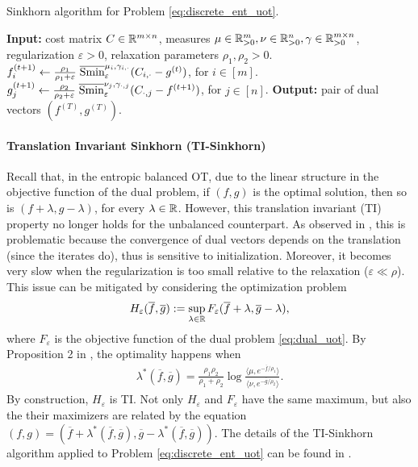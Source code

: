\begin{algorithm}[t]
  \caption{Sinkhorn algorithm for Problem \eqref{eq:discrete_ent_uot}.}
  \label{alg:Sinkhorn_algo}
\begin{algorithmic}[1]
  \STATE \textbf{Input:} cost matrix $C \in \mathbb R^{m \times n}$,
  measures $\mu \in \mathbb R^m_{> 0}, \nu \in \mathbb R^n_{> 0}, \gamma \in \mathbb R^{m \times n}_{> 0}$,
  regularization $\varepsilon > 0$, relaxation parameters $\rho_1, \rho_2 > 0$.
  \STATE $f_i^{(t+1)} \gets \frac{\rho_1}{\rho_1 + \varepsilon} \;
  \overline{\text{Smin}}^{\mu_i, \gamma_{i, \cdot}}_{\varepsilon}(C_{i, \cdot} - g^{(t)})$, for $i \in [m]$.
  \STATE $g_j^{(t+1)} \gets \frac{\rho_2}{\rho_2 + \varepsilon} \;
  \overline{\text{Smin}}^{\nu_j, \gamma_{\cdot, j}}_{\varepsilon}(C_{\cdot, j} - f^{(t+1)})$, for $j \in [n]$.
  \ENDFOR
  \STATE \textbf{Output:} pair of dual vectors $(f^{(T)}, g^{(T)})$.
\end{algorithmic}
\end{algorithm}

\paragraph{Translation Invariant Sinkhorn (TI-Sinkhorn)} Recall that, in the entropic balanced OT,
due to the linear structure in the objective function of the dual problem,
if $(f, g)$ is the optimal solution, then so is $(f + \lambda, g - \lambda)$,
for every $\lambda \in \mathbb R$. However, this translation invariant (TI) property no longer holds for
the unbalanced counterpart. As observed in \citep{Sejourne21}, this is problematic because
the convergence of dual vectors depends on the translation (since the iterates do),
thus is sensitive to initialization. Moreover, it becomes very slow when the regularization
is too small relative to the relaxation ($\varepsilon \ll \rho$).
This issue can be mitigated by considering the optimization problem
\begin{align}
  H_{\varepsilon}(\overline{f}, \overline{g}) := \sup_{\lambda \in \mathbb R}
  F_{\varepsilon}(\overline{f} + \lambda, \overline{g} - \lambda),
\end{align}
where $F_{\varepsilon}$ is the objective function of the dual problem \eqref{eq:dual_uot}.
By Proposition 2 in \citep{Sejourne21}, the optimality happens when
\begin{align}
  \label{eq:optimal_lambda}
  \lambda^*(\overline{f}, \overline{g}) = \frac{\rho_1 \rho_2}{\rho_1 + \rho_2}
  \log \frac{\langle \mu, e^{-\overline{f} / \rho_1} \rangle}
  {\langle \nu, e^{-\overline{g} / \rho_2} \rangle}.
\end{align}
By construction, $H_{\varepsilon}$ is TI. Not only $H_{\varepsilon}$ and $F_{\varepsilon}$
have the same maximum, but also the their maximizers are related by the equation
$(f, g) = (\overline{f} + \lambda^*(\overline{f}, \overline{g}), \overline{g} - \lambda^*(\overline{f}, \overline{g}))$.
The details of the TI-Sinkhorn algorithm applied to Problem \eqref{eq:discrete_ent_uot}
can be found in .

